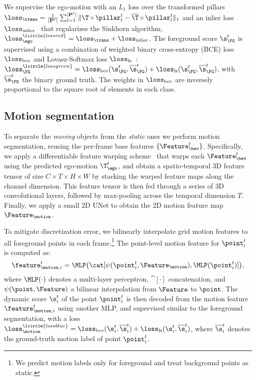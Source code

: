 We supervise the ego-motion with an $L_1$ loss over the transformed pillars $\loss_\trans =\frac{1}{|\mathbf{P}^t|}  \sum_{l=1}^{|\mathbf{P}^t|} \| \T \circ \pillar_l^t - \overline{\T} \circ \pillar_l^t \|_{1}$ and an inlier loss $\loss_{\text{inlier}}$~\cite{yew2020rpm} that regularizes the Sinkhorn algorithm, $\loss_\ego^\lcircle{lossred}=\loss_\trans + \loss_{\text{inlier}}$.
The foreground score $\s_\FG^t$ is supervised using a combination of weighted binary cross-entropy (BCE) loss $\loss_{\text{bce}}$ and Lovasz-Softmax loss $\loss_{\text{ls}}$~\cite{berman2018lovasz}: $\loss_\FG^\lcircle{lossgreen} = \loss_{\text{bce}}(\s_\FG^t, \overline{\s}_\FG^t) + \loss_{\text{ls}}(\s_\FG^t, \overline{\s}_\FG^t)$, with $\overline{\s}^t_\FG$ the binary ground truth.
The weights in $\loss_{\text{bce}}$ are inversely proportional to the square root of elements in each class. 


\subsection{Motion segmentation}
\label{sec:motion_seg}
To separate the \emph{moving} objects from the \emph{static} ones we perform motion segmentation, reusing the per-frame base features $\{\Feature_\bev^t\}$.
Specifically, we apply a differentiable feature warping scheme~\cite{sun2018pwc} that warps each $\Feature_\bev^t$ using the predicted ego-motion $\T^t_\ego$, and obtain a spatio-temporal 3D feature tensor of size {\small${C\times T\times H\times W}$} by stacking the warped feature maps along the channel dimension.
This feature tensor is then fed through a series of 3D convolutional layers, followed by max-pooling across the temporal dimension $T$. 
Finally, we apply a small 2D UNet to obtain the 2D motion feature map $\Feature_\motion$.

To mitigate discretization error, we bilinearly interpolate grid motion features to all foreground points in each frame.\footnote{We predict motion labels only for foreground and treat background points as static.}
The point-level motion feature for $\point_i^t$ is computed as:
\begin{equation}
    \label{eq:point-motion}
    \feature_{\motion,i}^t =\MLP\big(\cat[\psi(\point_i^t,\Feature_\motion), \MLP(\point_i^t)]\big),
\end{equation}
where $\MLP(\cdot)$ denotes a multi-layer perceptron, $\cat[\cdot]$ concatenation, and $\psi(\point, \Feature)$ a bilinear interpolation from $\Feature$ to $\point$.
The dynamic score $\s_i^t$ of the point $\point_i^t$ is then decoded from the motion feature $\feature_{\motion,i}^t$ using another MLP, and supervised similar to the foreground segmentation, with a loss $\loss_\motion^\lcircle{lossblue} = \loss_{\text{bce}}(\s_i^t, \overline{\s}_i^t) + \loss_{\text{ls}}(\s_i^t, \overline{\s}_i^t)$, where $\overline{\s}_i^t$ denotes the ground-truth motion label of point $\point_i^t$.


